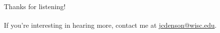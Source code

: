 \documentclass[usenames,dvipsnames,handout]{beamer}
\begin{document}
\begin{frame}

\begin{center}
    {\huge Thanks for listening!}
    \\
    \\
    {If you're interesting in hearing more, contact me at \href{jcdenson@wisc.edu}{jcdenson@wisc.edu}.}
    \ 
\end{center}

\end{frame}
\end{document}

